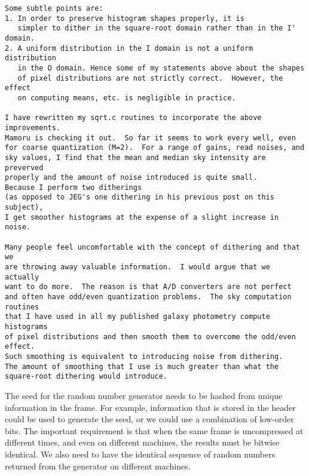 \begin{verbatim}
Some subtle points are:
1. In order to preserve histogram shapes properly, it is
   simpler to dither in the square-root domain rather than in the I' domain.
2. A uniform distribution in the I domain is not a uniform distribution
   in the O domain. Hence some of my statements above about the shapes
   of pixel distributions are not strictly correct.  However, the effect
   on computing means, etc. is negligible in practice.

I have rewritten my sqrt.c routines to incorporate the above improvements.
Mamoru is checking it out.  So far it seems to work every well, even
for coarse quantization (M=2).  For a range of gains, read noises, and
sky values, I find that the mean and median sky intensity are preverved
properly and the amount of noise introduced is quite small.
Because I perform two ditherings
(as opposed to JEG's one dithering in his previous post on this subject),
I get smoother histograms at the expense of a slight increase in noise.

Many people feel uncomfortable with the concept of dithering and that we
are throwing away valuable information.  I would argue that we actually
want to do more.  The reason is that A/D converters are not perfect
and often have odd/even quantization problems.  The sky computation routines
that I have used in all my published galaxy photometry compute histograms
of pixel distributions and then smooth them to overcome the odd/even effect.
Such smoothing is equivalent to introducing noise from dithering.
The amount of smoothing that I use is much greater than what the
square-root dithering would introduce.

\end{verbatim}

The seed for the random number generator needs to be hashed from 
unique information in the frame.  
For example, information that is stored in the header could be used
to generate the seed, or we could use a combination of low-order bits.
The important requirement is that
when the same frame
is uncompressed at different times, and even on different machines,
the results must be bitwise identical.  We also need to have the identical
sequence of random numbers returned from the generator on different 
machines.

\pagebreak

